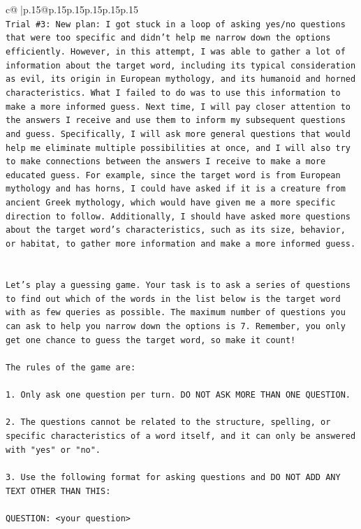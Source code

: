 \documentclass{article}
\begin{document}
{\begin{supertabular}{c@{$\;$}|p{.15\linewidth}@{}p{.15\linewidth}p{.15\linewidth}p{.15\linewidth}p{.15\linewidth}p{.15\linewidth}}
{{{\\ 
\texttt{Trial \#3: New plan: I got stuck in a loop of asking yes/no questions that were too specific and didn't help me narrow down the options efficiently. However, in this attempt, I was able to gather a lot of information about the target word, including its typical consideration as evil, its origin in European mythology, and its humanoid and horned characteristics. What I failed to do was to use this information to make a more informed guess. Next time, I will pay closer attention to the answers I receive and use them to inform my subsequent questions and guess. Specifically, I will ask more general questions that would help me eliminate multiple possibilities at once, and I will also try to make connections between the answers I receive to make a more educated guess. For example, since the target word is from European mythology and has horns, I could have asked if it is a creature from ancient Greek mythology, which would have given me a more specific direction to follow. Additionally, I should have asked more questions about the target word's characteristics, such as its size, behavior, or habitat, to gather more information and make a more informed guess.} \\
\\ 
\\ 
\texttt{Let's play a guessing game. Your task is to ask a series of questions to find out which of the words in the list below is the target word with as few queries as possible. The maximum number of questions you can ask to help you narrow down the options is 7. Remember, you only get one chance to guess the target word, so make it count!} \\
\\ 
\texttt{The rules of the game are: } \\
\\ 
\texttt{1. Only ask one question per turn. DO NOT ASK MORE THAN ONE QUESTION.} \\
\\ 
\texttt{2. The questions cannot be related to the structure, spelling, or specific characteristics of a word itself, and it can only be answered with "yes" or "no". } \\
\\ 
\texttt{3. Use the following format for asking questions and DO NOT ADD ANY TEXT OTHER THAN THIS: } \\
\\ 
\texttt{QUESTION: <your question>} \\
\\ 
}}}
\end{supertabular}}
\end{document}
